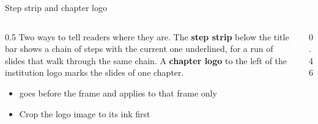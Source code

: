 
\begin{standardframe}{Step strip and chapter logo}
	\begin{columns}[T,onlytextwidth]
		\begin{column}{0.5\linewidth}
			\small
			Two ways to tell readers where they are. The \textbf{step strip} below the title bar shows a chain of steps with the current one underlined, for a run of slides that walk through the same chain. A \textbf{chapter logo} to the left of the institution logo marks the slides of one chapter.
			\par\medskip
			\begin{itemize}
				\item {} goes before the frame and applies to that frame only
				\item Crop the logo image to its ink first
			\end{itemize}
		\end{column}
		\begin{column}{0.46\linewidth}
		\end{column}
	\end{columns}
\end{standardframe}
